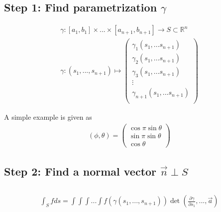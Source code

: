 \documentclass{article}
\numberwithin{equation}{section}
\newcommand{\<}{\langle}
\begin{document}
\subsection{Step 1: Find parametrization $\gamma$}
\begin{align*}
	\gamma :[a_1,b_1]\times ... \times [a_{n+1},b_{n+1}] \rightarrow S \subset \mathbb{R}^n \\
	\gamma: (s_1,...,s_{n+1}) \mapsto \begin{pmatrix}
	\gamma_1(s_1,...s_{n+1})\\
	\gamma_2(s_1,...s_{n+1})\\
	\gamma_3(s_1,...s_{n+1})\\
	\vdots \\
	\gamma_{n+1}(s_1,...s_{n+1})\\
	\end{pmatrix} 
\end{align*}

\begin{tcolorbox}[colback=blue!20!white]
A simple example is given as
\begin{align*}
(\phi, \theta) = \begin{pmatrix}
	\cos \pi \sin \theta\\
	\sin \pi \sin \theta\\
	\cos \theta
\end{pmatrix}
\end{align*}
\end{tcolorbox}
\subsection{Step 2: Find a normal vector $\vec{n}\perp S$}
\subsection{}
\begin{align*}
	\int_S f ds = \int \int \int ...\int f(\gamma(s_1,...,s_{n+1})) \det(\frac{\partial \gamma}{\partial s_1},...,\vec{a})
\end{align*}
\end{document}
